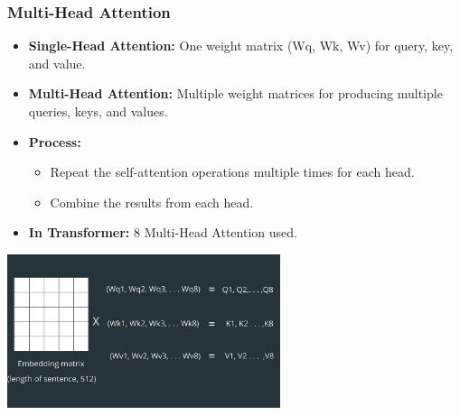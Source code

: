 \documentclass{beamer}
\begin{document}
\begin{frame}
  \frametitle{Multi-Head Attention}

  \begin{itemize}
    \item \textbf{Single-Head Attention:} One weight matrix (Wq, Wk, Wv) for query, key, and value.
    \item \textbf{Multi-Head Attention:} Multiple weight matrices for producing multiple queries, keys, and values.
    \item \textbf{Process:}
      \begin{itemize}
        \item Repeat the self-attention operations multiple times for each head.
        \item Combine the results from each head.
      \end{itemize}
    \item \textbf{In Transformer:} 8 Multi-Head Attention used.
  \end{itemize}
\pause
  \vspace{.01cm}

  \begin{center}
    \includegraphics[width=0.6\textwidth]{multi_head_attention_image.png} %
  \end{center}

\end{frame}
\end{document}
